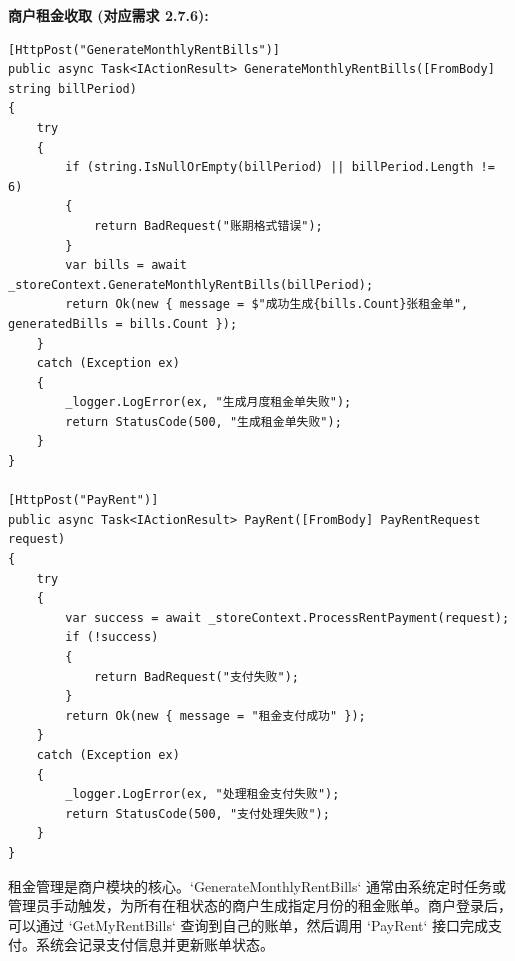 \documentclass[]{article}
\begin{document}
\textbf{商户租金收取 (对应需求 2.7.6):}
\begin{verbatim}
[HttpPost("GenerateMonthlyRentBills")]
public async Task<IActionResult> GenerateMonthlyRentBills([FromBody] string billPeriod)
{
    try
    {
        if (string.IsNullOrEmpty(billPeriod) || billPeriod.Length != 6)
        {
            return BadRequest("账期格式错误");
        }
        var bills = await _storeContext.GenerateMonthlyRentBills(billPeriod);
        return Ok(new { message = $"成功生成{bills.Count}张租金单", generatedBills = bills.Count });
    }
    catch (Exception ex)
    {
        _logger.LogError(ex, "生成月度租金单失败");
        return StatusCode(500, "生成租金单失败");
    }
}

[HttpPost("PayRent")]
public async Task<IActionResult> PayRent([FromBody] PayRentRequest request)
{
    try
    {
        var success = await _storeContext.ProcessRentPayment(request);
        if (!success)
        {
            return BadRequest("支付失败");
        }
        return Ok(new { message = "租金支付成功" });
    }
    catch (Exception ex)
    {
        _logger.LogError(ex, "处理租金支付失败");
        return StatusCode(500, "支付处理失败");
    }
}
\end{verbatim}
租金管理是商户模块的核心。`GenerateMonthlyRentBills` 通常由系统定时任务或管理员手动触发，为所有在租状态的商户生成指定月份的租金账单。商户登录后，可以通过 `GetMyRentBills` 查询到自己的账单，然后调用 `PayRent` 接口完成支付。系统会记录支付信息并更新账单状态。
\end{document}
